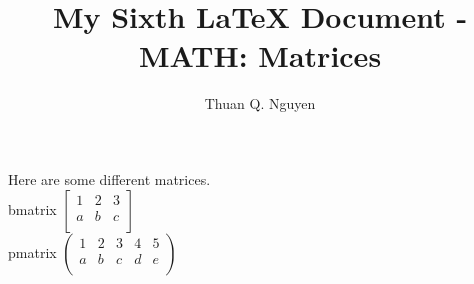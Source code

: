 \documentclass{article}
\begin{document}
\title{My Sixth \LaTeX{} Document - MATH: Matrices}
\author{Thuan Q. Nguyen}
\maketitle


Here are some different matrices. \\
bmatrix
$
\begin{bmatrix}
	1 & 2 & 3 \\
	a & b & c \\
\end{bmatrix}
$ \\

pmatrix
$
\begin{pmatrix}
	1 & 2 & 3 & 4 & 5 \\
	a & b & c & d & e \\
\end{pmatrix}
$ \\
\end{document}
